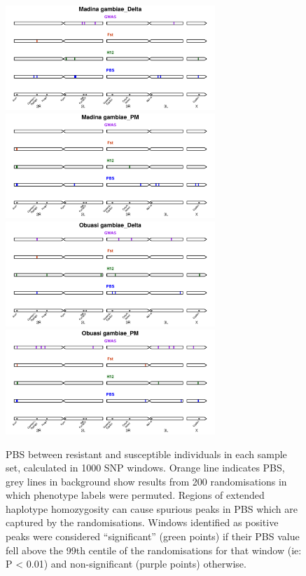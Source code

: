 \documentclass[a4paper,12pt]{article}
\begin{document}
\begin{figure}[h]
	\vskip 0.4cm
	\includegraphics*[width = 7.9cm]{../supplementary_implicated_regions/Madina_gambiae_Delta_implicated_regions.pdf}
	\includegraphics*[width = 7.9cm]{../supplementary_implicated_regions/Madina_gambiae_PM_implicated_regions.pdf}
	\vskip 0.4cm
	\includegraphics*[width = 7.9cm]{../supplementary_implicated_regions/Obuasi_gambiae_Delta_implicated_regions.pdf}
	\includegraphics*[width = 7.9cm]{../supplementary_implicated_regions/Obuasi_gambiae_PM_implicated_regions.pdf}
	\caption{\footnotesize PBS between resistant and susceptible individuals in each sample set, calculated in 1000 SNP windows. Orange line indicates PBS, grey lines in background show results from 200 randomisations in which phenotype labels were permuted. Regions of extended haplotype homozygosity can cause spurious peaks in PBS which are captured by the randomisations. Windows identified as positive peaks were considered ``significant'' (green points) if their PBS value fell above the 99th centile of the randomisations for that window (ie: P < 0.01) and non-significant (purple points) otherwise.}
	\label{FigS5}
\end{figure}
\end{document}
